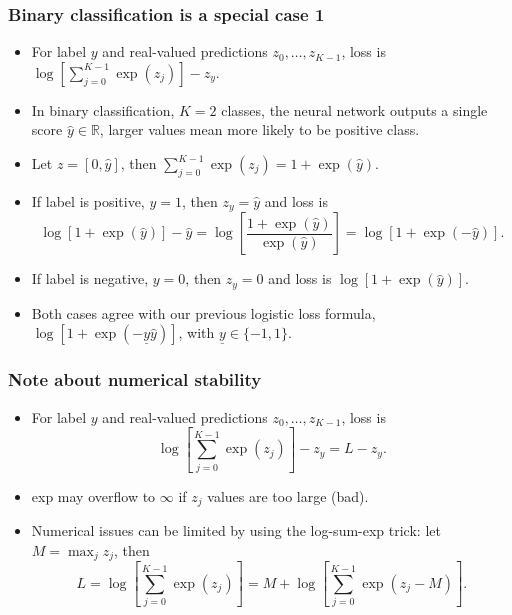 \documentclass{beamer}
\begin{document}
\begin{frame}
  \frametitle{Binary classification is a special case 1}
  \begin{itemize}
  \item For label $y$ and real-valued predictions $z_0,\dots,z_{K-1}$, loss is
$
\log
\left[
\sum_{j=0}^{K-1}  \exp(z_j) 
\right]
-z_y.
$
\item In binary classification, $K=2$ classes, the neural network
  outputs a single score $\hat y\in\mathbb R$, larger values mean more
  likely to be positive class.
\item Let $z=[0,\hat y]$, then $\sum_{j=0}^{K-1} \exp(z_j) = 1+\exp(\hat y)$.
\item If label is positive, $y=1$, then $z_y=\hat y$ and loss is 
$$
\log
\left[
1+\exp(\hat y)
\right]
-\hat y
=
\log\left[
\frac{1+\exp(\hat y)}{\exp(\hat y)}
\right]
=
\log[1+\exp(-\hat y)].
$$
\item If label is negative, $y=0$, then $z_y=0$ and loss is
$
\log
\left[
1+\exp(\hat y)
\right].
$
\item Both cases agree with our previous logistic loss formula,
  $\log[1+\exp(-\underline y \hat y)]$, with $\underline y\in\{-1,1\}$.
\end{itemize}
\end{frame}

\begin{frame}
  \frametitle{Note about numerical stability}
  \begin{itemize}
  \item For label $y$ and real-valued predictions $z_0,\dots,z_{K-1}$, loss is
$$
\log
\left[
\sum_{j=0}^{K-1}  \exp(z_j) 
\right]
-z_y= L-z_y.
$$
\item exp may overflow to $\infty$ if $z_j$ values are too large (bad).
\item Numerical issues can be limited by using the log-sum-exp trick:
  let $M=\max_j z_j$, then
$$
L = \log
\left[
\sum_{j=0}^{K-1}  \exp(z_j) 
\right]
= 
M+\log
\left[
\sum_{j=0}^{K-1}  \exp(z_j-M) 
\right].
$$
  \end{itemize}
\end{frame}
\end{document}
